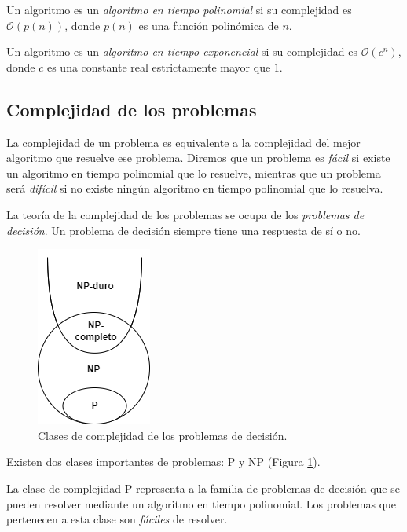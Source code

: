 \begin{definition}
    Un algoritmo es un \emph{algoritmo en tiempo polinomial} si su complejidad es $\mathcal{O}(p(n))$, donde $p(n)$ es una función polinómica de $n$.
\end{definition}

\begin{definition}
    Un algoritmo es un \emph{algoritmo en tiempo exponencial} si su complejidad es $\mathcal{O}(c^n)$, donde $c$ es una constante real estrictamente mayor que $1$.
\end{definition}

\subsection{Complejidad de los problemas}

La complejidad de un problema es equivalente a la complejidad del mejor algoritmo que resuelve ese problema. Diremos que un problema es \emph{fácil} si existe un algoritmo en tiempo polinomial que lo resuelve, mientras que un problema será \emph{difícil} si no existe ningún algoritmo en tiempo polinomial que lo resuelva.

La teoría de la complejidad de los problemas se ocupa de los \emph{problemas de decisión}. Un problema de decisión siempre tiene una respuesta de sí o no.

\begin{figure}[H]   
	\center
	\includegraphics[scale=0.5]{figures/Complejidad.png}
	\caption{Clases de complejidad de los problemas de decisión.}
    \label{fg:complexity}
\end{figure}

Existen dos clases importantes de problemas: P y NP (Figura \ref{fg:complexity}).

La clase de complejidad P representa a la familia de problemas de decisión que se pueden resolver mediante un algoritmo en tiempo polinomial. Los problemas que pertenecen a esta clase son \emph{fáciles} de resolver.

